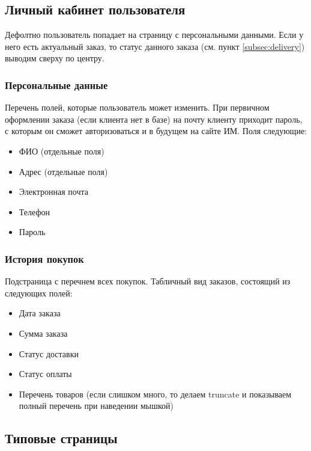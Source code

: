\documentclass[DIV=calc, paper=a4, fontsize=11pt]{scrartcl} %
\begin{document}
\subsection{Личный кабинет пользователя}
Дефолтно пользователь попадает на страницу с персональными данными. Если у него есть актуальный заказ, то статус данного заказа (см. пункт \ref{subsec:delivery}) выводим сверху по центру.

\subsubsection{Персональные данные}
Перечень полей, которые пользователь может изменить. При первичном оформлении заказа (если клиента нет в базе) на почту клиенту приходит пароль, с которым он сможет авторизоваться и в будущем на сайте ИМ. Поля следующие:
\begin{itemize}
	\item ФИО (отдельные поля)
	\item Адрес (отдельные поля)
	\item Электронная почта
	\item Телефон
	\item Пароль
\end{itemize}

\subsubsection{История покупок}
Подстраница с перечнем всех покупок. Табличный вид заказов, состоящий из следующих полей:
\begin{itemize}
	\item Дата заказа
	\item Сумма заказа
	\item Статус доставки
	\item Статус оплаты
	\item Перечень товаров (если слишком много, то делаем truncate и показываем полный перечень при наведении мышкой)
\end{itemize}

\subsection{Типовые страницы}
\end{document}
